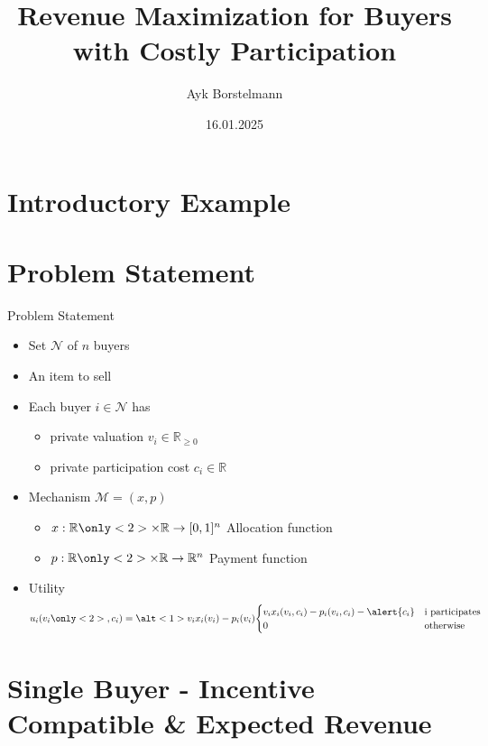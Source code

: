 \documentclass{beamer}
\title{Revenue Maximization for Buyers with Costly Participation}
\date{16.01.2025}
\author{Ayk Borstelmann}
\institute{
    Seminar Algorithmic Game Theory
}
\begin{document}
\maketitle
\section{Introductory Example}
\section{Problem Statement}
\begin{frame}{Problem Statement}
  \begin{itemize}
    \item Set $\mathcal{N}$ of $n$ buyers
    \item An item to sell
    \item Each buyer $i \in \mathcal{N}$ has
          \begin{itemize}
            \item private valuation $v_i \in \mathbb{R}_{\geq0}$
            \item<2-> \alert{private participation cost $c_i \in \mathbb{R}$}
          \end{itemize}
    \item Mechanism $\mathcal{M} = (x,p)$
          \begin{itemize}
            \item $x: \mathbb{R} \only<2>{\times \mathbb{R}} \rightarrow [0,1]^n$ Allocation function
            \item $p: \mathbb{R} \only<2>{\times \mathbb{R}} \rightarrow \mathbb{R}^n$ Payment function
          \end{itemize}
    \item Utility
          \begin{align*}
            u_i(v_i\only<2>{, c_i}) = \alt<1>{v_i x_i(v_i) - p_i(v_i)}{\begin{cases}v_i x_i(v_i, c_i) - p_i(v_i, c_i) - \alert{c_i} & \text{i participates} \\ 0 & \text{otherwise}\end{cases}}
          \end{align*}
  \end{itemize}
\end{frame}
\section{Single Buyer - Incentive Compatible \& Expected Revenue}
\end{document}

